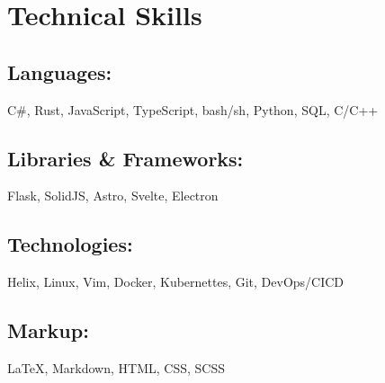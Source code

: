 \section{Technical Skills}

\subsection{Languages:} C\#, Rust, JavaScript, TypeScript, bash/sh, Python, SQL, C/C++
\subsection{Libraries \& Frameworks:} Flask, SolidJS, Astro, Svelte, Electron
\subsection{Technologies:} Helix, Linux, Vim, Docker, Kubernettes, Git, DevOps/CICD
\subsection{Markup:} {\LaTeX}, Markdown, HTML, CSS, SCSS
